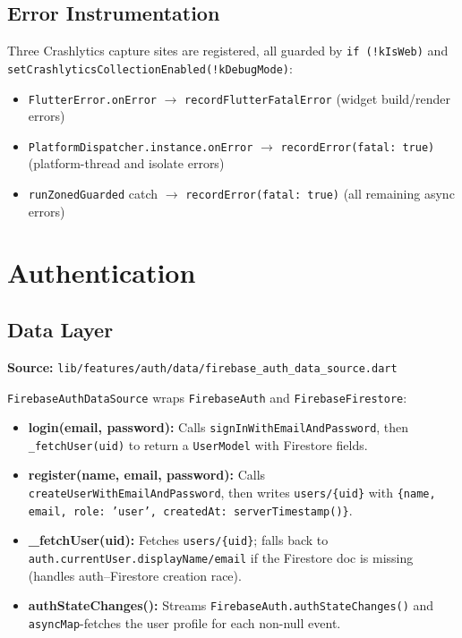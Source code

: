 \documentclass[11pt,a4paper]{article}
\begin{document}
\subsection{Error Instrumentation}

Three Crashlytics capture sites are registered, all guarded by \texttt{if (!kIsWeb)}
and \texttt{setCrashlyticsCollectionEnabled(!kDebugMode)}:

\begin{itemize}
  \item \texttt{FlutterError.onError} $\rightarrow$ \texttt{recordFlutterFatalError}
    (widget build/render errors)
  \item \texttt{PlatformDispatcher.instance.onError} $\rightarrow$
    \texttt{recordError(fatal: true)} (platform-thread and isolate errors)
  \item \texttt{runZonedGuarded} catch $\rightarrow$ \texttt{recordError(fatal: true)}
    (all remaining async errors)
\end{itemize}

\section{Authentication}

\subsection{Data Layer}

\textbf{Source:} \texttt{lib/features/auth/data/firebase\_auth\_data\_source.dart}

\texttt{FirebaseAuthDataSource} wraps \texttt{FirebaseAuth} and \texttt{FirebaseFirestore}:

\begin{itemize}
  \item \textbf{login(email, password):} Calls \texttt{signInWithEmailAndPassword},
    then \texttt{\_fetchUser(uid)} to return a \texttt{UserModel} with Firestore fields.
  \item \textbf{register(name, email, password):} Calls
    \texttt{createUserWithEmailAndPassword}, then writes
    \texttt{users/\{uid\}} with \texttt{\{name, email, role:\,'user',
    createdAt:\,serverTimestamp()\}}.
  \item \textbf{\_fetchUser(uid):} Fetches \texttt{users/\{uid\}}; falls back to
    \texttt{auth.currentUser.displayName/email} if the Firestore doc is missing (handles
    auth--Firestore creation race).
  \item \textbf{authStateChanges():} Streams \texttt{FirebaseAuth.authStateChanges()}
    and \texttt{asyncMap}-fetches the user profile for each non-null event.
\end{itemize}
\end{document}
